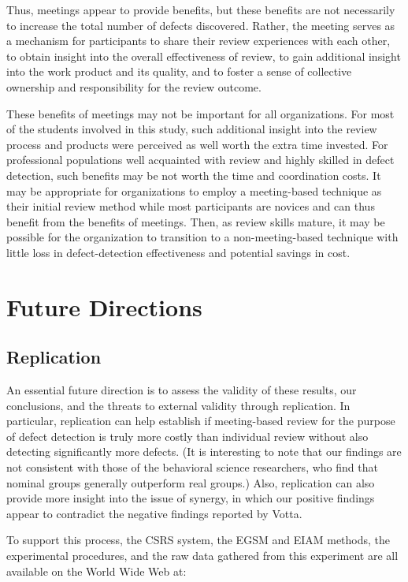 Thus, meetings appear to provide benefits, but these benefits are not
necessarily to increase the total number of defects discovered.  Rather,
the meeting serves as a mechanism for participants to share their review
experiences with each other, to obtain insight into the overall
effectiveness of review, to gain additional insight into the work product
and its quality, and to foster a sense of collective ownership and
responsibility for the review outcome.

These benefits of meetings may not be important for all organizations.  For
most of the students involved in this study, such additional insight into
the review process and products were perceived as well worth the extra time
invested.  For professional populations well acquainted with review and
highly skilled in defect detection, such benefits may be not worth the time
and coordination costs.  It may be appropriate for organizations to employ
a meeting-based technique as their initial review method while most
participants are novices and can thus benefit from the benefits of
meetings.  Then, as review skills mature, it may be possible for the
organization to transition to a non-meeting-based technique with little
loss in defect-detection effectiveness and potential savings in cost.

\section{Future Directions}

\subsection{Replication}
\label{sec:replication}

An essential future direction is to assess the validity of these results,
our conclusions, and the threats to external validity through replication.
In particular, replication can help establish if meeting-based review for
the purpose of defect detection is truly more costly than individual review
without also detecting significantly more defects. (It is interesting to
note that our findings are not consistent with those of the behavioral
science researchers, who find that nominal groups generally outperform real
groups.) Also, replication can also provide more insight into the issue of
synergy, in which our positive findings 
appear to contradict the negative findings reported by Votta.

To support this process, the CSRS system, the EGSM and EIAM methods, 
the experimental procedures, and the raw data gathered from
this experiment are all available on the World Wide Web at:

